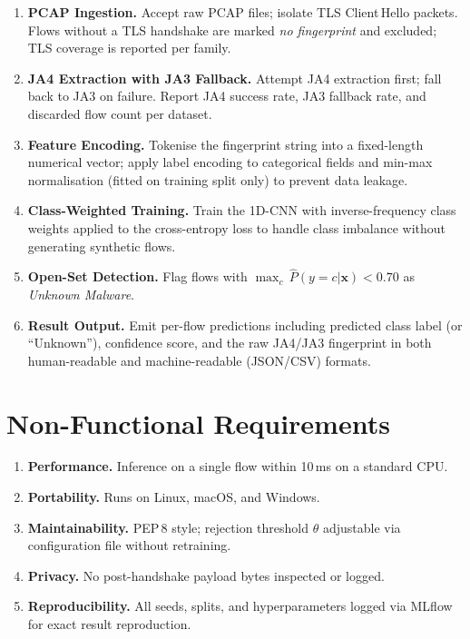 \documentclass[12pt,a4paper]{report}
\begin{document}
\begin{enumerate}[leftmargin=*, label=\textbf{FR\arabic*.}]
  \item \textbf{PCAP Ingestion.} Accept raw PCAP files; isolate TLS Client\,Hello
  packets. Flows without a TLS handshake are marked \textit{no fingerprint} and
  excluded; TLS coverage is reported per family.

  \item \textbf{JA4 Extraction with JA3 Fallback.} Attempt JA4 extraction first;
  fall back to JA3 on failure. Report JA4 success rate, JA3 fallback rate, and
  discarded flow count per dataset.

  \item \textbf{Feature Encoding.} Tokenise the fingerprint string into a
  fixed-length numerical vector; apply label encoding to categorical fields and
  min-max normalisation (fitted on training split only) to prevent data leakage.

  \item \textbf{Class-Weighted Training.} Train the 1D-CNN with inverse-frequency
  class weights applied to the cross-entropy loss to handle class imbalance
  without generating synthetic flows.

  \item \textbf{Open-Set Detection.} Flag flows with
  $\max_c\,\hat{P}(y{=}c|\mathbf{x}) < 0.70$ as \textit{Unknown Malware}.

  \item \textbf{Result Output.} Emit per-flow predictions including predicted
  class label (or ``Unknown''), confidence score, and the raw JA4/JA3 fingerprint
  in both human-readable and machine-readable (JSON/CSV) formats.
\end{enumerate}

\section{Non-Functional Requirements}

\begin{enumerate}[leftmargin=*, label=\textbf{NF\arabic*.}]
  \item \textbf{Performance.} Inference on a single flow within 10\,ms on
  a standard CPU.
  \item \textbf{Portability.} Runs on Linux, macOS, and Windows.
  \item \textbf{Maintainability.} PEP\,8 style; rejection threshold $\theta$
  adjustable via configuration file without retraining.
  \item \textbf{Privacy.} No post-handshake payload bytes inspected or logged.
  \item \textbf{Reproducibility.} All seeds, splits, and hyperparameters logged
  via MLflow for exact result reproduction.
\end{enumerate}
\end{document}
